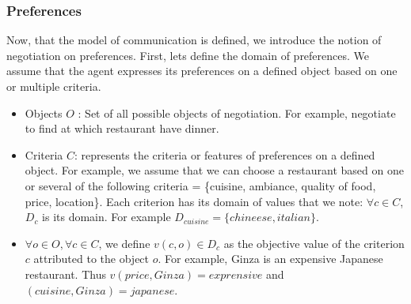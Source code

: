 \documentclass{llncs}
\begin{document}
\subsubsection{Preferences}
\par Now, that  the model of communication is defined, we introduce the notion of negotiation on preferences. First, lets define the domain of preferences. We assume that the agent expresses its preferences on a defined object based on one or multiple criteria.   
 \begin{itemize}
 \item Objects $O$ : Set of all possible objects of negotiation. For example, negotiate to find at which restaurant have dinner.
 \item Criteria $C$: represents the criteria or features of preferences on a defined object. For example, we assume that we can choose a restaurant based on one or several of the following criteria = \{cuisine, ambiance, quality of food, price, location\}. Each criterion has its domain of values that we note: $\forall c \in C$, $D_{c}$ is its domain. For example $D_{cuisine} = \{chineese, italian\}$.

 \item $\forall o \in O, \forall c \in C$, we define $v(c,o) \in D_{c}$ as the objective value of the criterion $c$ attributed to the object $o$. For example, Ginza is an expensive Japanese restaurant. Thus $v(price, Ginza) = exprensive$ and $(cuisine, Ginza) = japanese$. 
 

\end{itemize}
\end{document}
